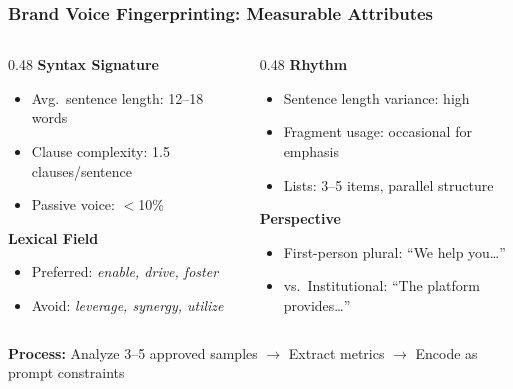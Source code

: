 \documentclass{beamer}
\begin{document}
\begin{frame}
    \frametitle{Brand Voice Fingerprinting: Measurable Attributes}
    \begin{columns}[T]
        \begin{column}{0.48\textwidth}
            \textbf{Syntax Signature}
            \begin{itemize}
                \item Avg.\ sentence length: 12--18 words
                \item Clause complexity: 1.5 clauses/sentence
                \item Passive voice: $<$10\%
            \end{itemize}
            
            \vspace{0.2cm}
            \textbf{Lexical Field}
            \begin{itemize}
                \item Preferred: \emph{enable, drive, foster}
                \item Avoid: \emph{leverage, synergy, utilize}
            \end{itemize}
        \end{column}
        
        \begin{column}{0.48\textwidth}
            \textbf{Rhythm}
            \begin{itemize}
                \item Sentence length variance: high
                \item Fragment usage: occasional for emphasis
                \item Lists: 3--5 items, parallel structure
            \end{itemize}
            
            \vspace{0.2cm}
            \textbf{Perspective}
            \begin{itemize}
                \item First-person plural: ``We help you\ldots''
                \item vs.\ Institutional: ``The platform provides\ldots''
            \end{itemize}
        \end{column}
    \end{columns}
    
    \vspace{0.3cm}
    \textbf{Process:} Analyze 3--5 approved samples $\rightarrow$ Extract metrics $\rightarrow$ Encode as prompt constraints
\end{frame}
\end{document}

